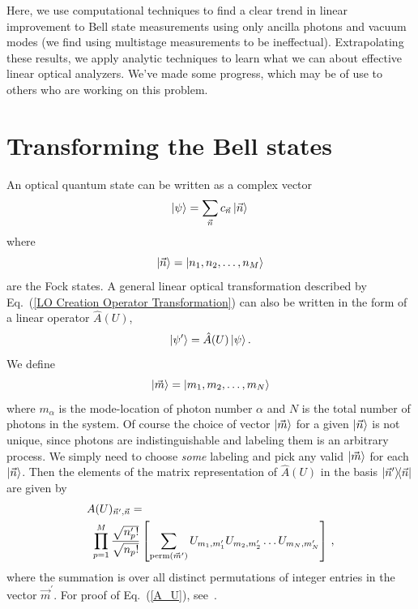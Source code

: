 \documentclass[aps,pra,twocolumn,showpacs,superscriptaddress,floatfix,10pt]{revtex4}
\begin{document}
Here, we use computational techniques to find a clear trend in linear improvement to Bell state measurements using only ancilla photons and vacuum modes (we find using multistage measurements to be ineffectual). Extrapolating these results, we apply analytic techniques to learn what we can about effective linear optical analyzers. We've made some progress, which may be of use to others who are working on this problem.
\section{Transforming the Bell states}
An optical quantum state can be written as a complex vector
\begin{equation}
\label{LO State Fock Vec Basis}
\ket{\psi} = \sum_{\vec{n}} c_{\vec{n}} \ket{\vec{n}} \,
\end{equation}
where
\begin{equation}
\ket{\vec{n}} = \ket{n_1,n_2,\dots,n_M}
\end{equation}
are the Fock states. A general linear optical transformation described by Eq.~(\ref{LO Creation Operator Transformation}) can also be written in the form of a linear operator $\hat{A}(U)$,
\begin{equation}
	\ket{\psi^\prime} = \hat{A}(U) \ket{\psi}.
\end{equation}
We define
\begin{equation}
\label{m definition}
\ket{\vec{m}} = \ket{m_1,m_2,\dots,m_N}
\end{equation}
where $m_\alpha$ is the mode-location of photon number $\alpha$ and $N$ is the total number of photons in the system. Of course the choice of vector $\ket{\vec{m}}$ for a given $\ket{\vec{n}}$ is not unique, since photons are indistinguishable and labeling them is an arbitrary process. We simply need to choose \textit{some} labeling and pick any valid $\ket{\vec{m}}$ for each $\ket{\vec{n}}$. Then the elements of the matrix representation of $\hat{A}(U)$ in the basis $\outerproduct{\vec{n}^\prime}{\vec{n}}$ are given by
\begin{eqnarray}
\label{A_U}
A(U)_{\vec{n}^\prime,\vec{n}} = \quad \quad \quad \quad \quad \quad \quad \quad \quad \quad \quad \quad \quad \quad \quad \quad \quad \\ \small \nonumber \prod_{p=1}^{M} \frac{\sqrt{n_p^\prime !}}{\sqrt{n_p !}} \left[\sum_{\textrm{perm}(\vec{m}^\prime)} U_{m_1, m_1^\prime} U_{m_2, m_2^\prime} \dots U_{m_N, m_N^\prime} \right] \,,
\end{eqnarray}
where the summation is over all distinct permutations of integer entries in the vector $\vec{m}^\prime$. For proof of Eq.~(\ref{A_U}), see~\cite{Jake Smith}.
\end{document}
